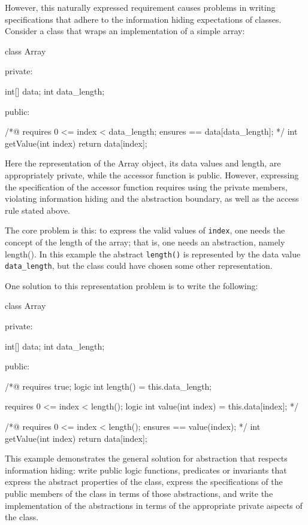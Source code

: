 However, this naturally expressed requirement causes problems in writing specifications that adhere to the information hiding expectations of classes. Consider a class that wraps an implementation of a simple array:

\begin{listing-nonumber}
class Array {
	
  private:
	
	int[] data;
	int data_length;

  public:
	
	/*@ 
	requires 0 <= index < data\_length;
	ensures \result == data[data\_length];
	*/
	int getValue(int index) {
		return data[index];
	}
}
\end{listing-nonumber}

Here the representation of the Array object, its data values and length, are appropriately private, while the accessor function is public.
However, expressing the specification of the accessor function requires using the private members, violating information hiding and
the abstraction boundary, as well as the access rule stated above.

The core problem is this: to express the valid values of \lstinline|index|, one needs the concept of the length of the array; that is, one needs an abstraction, namely length(). In this example the abstract \lstinline|length()| is represented by the data value \lstinline|data_length|, but the class could have chosen some other representation.

One solution to this representation problem is to write the following:

\begin{listing-nonumber}
class Array {
	
  private:
	
	int[] data;
	int data_length;
	
  public:
	
	/*@
	   requires true;
	   logic int length() = this.data_length; 
	   
	   requires 0 <= index < length();
	   logic int value(int index) = this.data[index];
	*/
	
	/*@ 
	   requires 0 <= index < length();
	   ensures \result == value(index);
	*/
	int getValue(int index) {
		return data[index];
	}
}
\end{listing-nonumber}

This example demonstrates the general solution for abstraction that respects information hiding: write public logic functions, predicates or invariants that express the abstract properties of the class, express the specifications of the public members of the class in terms of those abstractions, and write the implementation of the abstractions in terms of the appropriate private aspects of the class.

